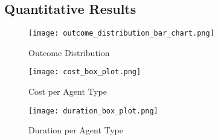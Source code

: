 \begin{comment}
Results should be clearly displayed and should provide a suitable representation of your results for the points you wish to make.
Graphs should be labelled in a legible font. If more than one result is displayed in the same graph, then these should be clearly marked.
Please choose carefully rather than presenting every result. Too much information is hard to read and often hides the key information you wish to present. Make use of statistical methods when presenting results, where possible to strengthen the results.
Further, the format of the presentation of results should be chosen based on what issues in the results you wish to highlight.
You may wish to present a subset in the experimental section and provide additional results in an appendix.
Point out specifics here but save the overall/general discussion to the Discussion chapter.
\end{comment}

\subsection{Quantitative Results}

\begin{figure}[htbp]
    \centering
    \texttt{[image: outcome\_distribution\_bar\_chart.png]}
    \caption{Outcome Distribution}
    \label{fig:outcome_distribution}
\end{figure}

\begin{figure}[htbp]
    \centering
    \texttt{[image: cost\_box\_plot.png]}
    \caption{Cost per Agent Type}
    \label{fig:cost_box_plot}
\end{figure}

\begin{figure}[htbp]
    \centering
    \texttt{[image: duration\_box\_plot.png]}
    \caption{Duration per Agent Type}
    \label{fig:duration_box_plot}
\end{figure}

